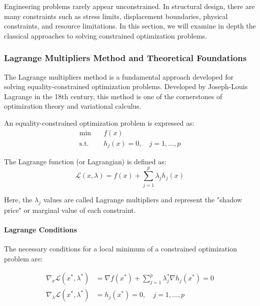 Engineering problems rarely appear unconstrained. In structural design, there are many constraints such as stress limits, displacement boundaries, physical constraints, and resource limitations. In this section, we will examine in depth the classical approaches to solving constrained optimization problems.

\subsubsection{Lagrange Multipliers Method and Theoretical Foundations}

The Lagrange multipliers method is a fundamental approach developed for solving equality-constrained optimization problems. Developed by Joseph-Louis Lagrange in the 18th century, this method is one of the cornerstones of optimization theory and variational calculus.

An equality-constrained optimization problem is expressed as:
\begin{equation}
\begin{aligned}
\min & \quad f(x) \\
\text{s.t.} & \quad h_j(x) = 0, \quad j = 1, \ldots, p
\end{aligned}
\end{equation}

The Lagrange function (or Lagrangian) is defined as:
\begin{equation}
\mathcal{L}(x,\lambda) = f(x) + \sum_{j=1}^p \lambda_j h_j(x)
\end{equation}

Here, the $\lambda_j$ values are called Lagrange multipliers and represent the "shadow price" or marginal value of each constraint.


\paragraph{Lagrange Conditions}
The necessary conditions for a local minimum of a constrained optimization problem are:

\begin{equation}
\begin{aligned}
\nabla_x \mathcal{L}(x^*,\lambda^*) &= \nabla f(x^*) + \sum_{j=1}^p \lambda_j^* \nabla h_j(x^*) = 0 \\
\nabla_{\lambda} \mathcal{L}(x^*,\lambda^*) &= h_j(x^*) = 0, \quad j = 1, \ldots, p
\end{aligned}
\end{equation}

